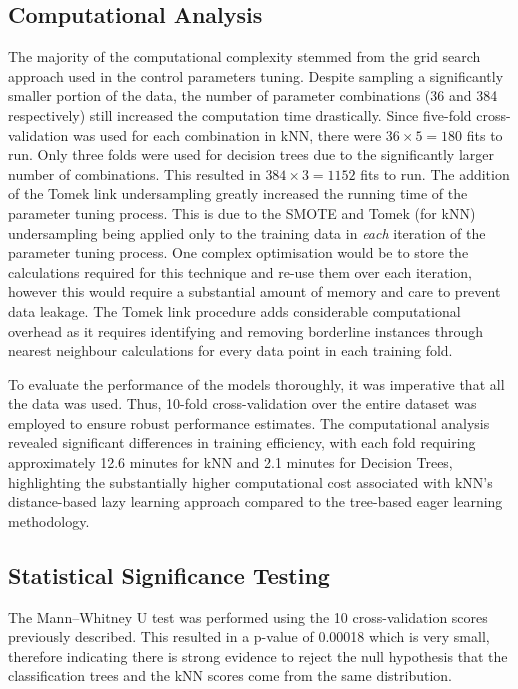 \documentclass[10pt, conference]{IEEEtran}
\begin{document}
\subsection{Computational Analysis}
The majority of the computational complexity stemmed from the grid search approach used in the control parameters tuning. Despite sampling a significantly smaller portion of the data, the number of parameter combinations (36 and 384 respectively)  still increased the computation time drastically. Since five-fold cross-validation was used for each combination in kNN, there were $36 \times 5 = 180$ fits to run. Only three folds were used for decision trees due to the significantly larger number of combinations. This resulted in $384 \times 3 = 1152$ fits to run. The addition of the Tomek link undersampling greatly increased the running time of the parameter tuning process. This is due to the SMOTE and Tomek (for kNN) undersampling being applied only to the training data in \textit{each} iteration of the parameter tuning process. One complex optimisation would be to store the calculations required for this technique and re-use them over each iteration, however this would require a substantial amount of memory and care to prevent data leakage. The Tomek link procedure adds considerable computational overhead as it requires identifying and removing borderline instances through nearest neighbour calculations for every data point in each training fold.

To evaluate the performance of the models thoroughly, it was imperative that all the data was used. Thus, 10-fold cross-validation over the entire dataset was employed to ensure robust performance estimates. The computational analysis revealed significant differences in training efficiency, with each fold requiring approximately 12.6 minutes for kNN and 2.1 minutes for Decision Trees, highlighting the substantially higher computational cost associated with kNN's distance-based lazy learning approach compared to the tree-based eager learning methodology.

\subsection{Statistical Significance Testing}
The Mann–Whitney U test \cite{mann1947test} was performed using the 10 cross-validation scores previously described. This resulted in a p-value of 0.00018 which is very small, therefore indicating there is strong evidence to reject the null hypothesis that the classification trees and the kNN scores come from the same distribution.
\end{document}
